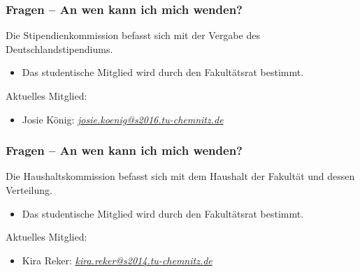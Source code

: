 \documentclass[10pt]{beamer}
\begin{document}
\begin{frame}
	\frametitle{Fragen -- An wen kann ich mich wenden?}

	\begin{block}{\vphantom{X}}
		Die Stipendienkommission befasst sich mit der Vergabe des Deutschlandstipendiums.
	\end{block}

	\begin{itemize}
		\item Das studentische Mitglied wird durch den Fakultätsrat bestimmt.
	\end{itemize}

	\vspace*{1.0cm}

	Aktuelles Mitglied:
	\begin{itemize}
		\item Josie König: \textit{\href{mailto:josie.koenig@s2016.tu-chemnitz.de}{josie.koenig@s2016.tu-chemnitz.de}}
	\end{itemize}
\end{frame}

\begin{frame}
	\frametitle{Fragen -- An wen kann ich mich wenden?}

	\begin{block}{\vphantom{X}}
		Die Haushaltskommission befasst sich mit dem Haushalt der Fakultät und dessen Verteilung.
	\end{block}

	\begin{itemize}
		\item Das studentische Mitglied wird durch den Fakultätsrat bestimmt.
	\end{itemize}

	\vspace*{1.0cm}

	Aktuelles Mitglied:

	\begin{itemize}
		\item Kira Reker: \textit{\href{mailto:kira.reker@s2014.tu-chemnitz.de}{kira.reker@s2014.tu-chemnitz.de}}   
	\end{itemize}
\end{frame}
\end{document}
